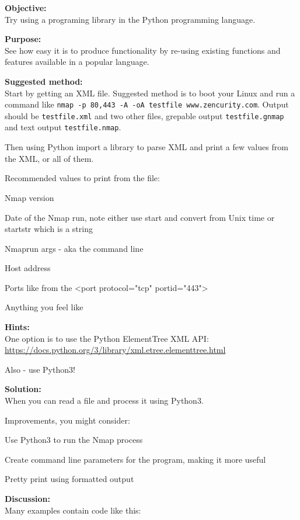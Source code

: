 \documentclass[a4paper,11pt,notitlepage]{report}
\begin{document}
{\bf Objective:}\\
Try using a programing library in the Python programming language.

{\bf Purpose:}\\
See how easy it is to produce functionality by re-using existing functions and features available in a popular language.

{\bf Suggested method:}\\
Start by getting an XML file. Suggested method is to boot your Linux and run a command like \verb+nmap -p 80,443 -A -oA testfile www.zencurity.com+. Output should be \verb+testfile.xml+ and two other files, grepable output \verb+testfile.gnmap+ and text output \verb+testfile.nmap+.

Then using Python import a library to parse XML and print a few values from the XML, or all of them.

Recommended values to print from the file:
\begin{list2}
\item Nmap version
\item Date of the Nmap run, note either use start and convert from Unix time or startstr which is a string
\item Nmaprun args - aka the command line
\item Host address
\item Ports like from the <port protocol="tcp" portid="443">
\item Anything you feel like
\end{list2}

{\bf Hints:}\\
One option is to use the Python ElementTree XML API:\\
\url{https://docs.python.org/3/library/xml.etree.elementtree.html}

Also - use Python3!

{\bf Solution:}\\
When you can read a file and process it using Python3.

Improvements, you might consider:
\begin{list2}
\item Use Python3 to run the Nmap process
\item Create command line parameters for the program, making it more useful
\item Pretty print using formatted output
\end{list2}
{\bf Discussion:}\\
Many examples contain code like this:
\end{document}
